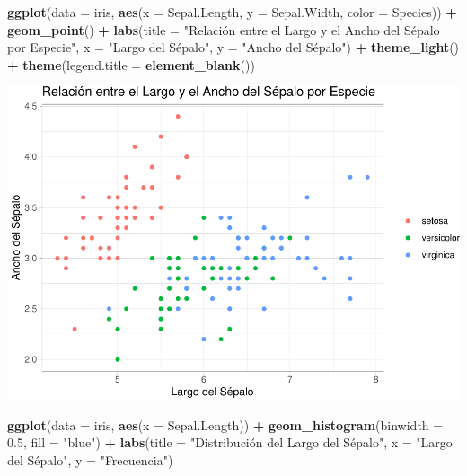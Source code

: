 \documentclass[
]{book}
\newenvironment{Shaded}{\begin{snugshade}}{\end{snugshade}}
\newcommand{\AttributeTok}[1]{\textcolor[rgb]{0.13,0.29,0.53}{#1}}
\newcommand{\FloatTok}[1]{\textcolor[rgb]{0.00,0.00,0.81}{#1}}
\newcommand{\FunctionTok}[1]{\textcolor[rgb]{0.13,0.29,0.53}{\textbf{#1}}}
\newcommand{\NormalTok}[1]{#1}
\newcommand{\SpecialCharTok}[1]{\textcolor[rgb]{0.81,0.36,0.00}{\textbf{#1}}}
\newcommand{\StringTok}[1]{\textcolor[rgb]{0.31,0.60,0.02}{#1}}
\begin{document}
\begin{Shaded}
\begin{Highlighting}[]
\FunctionTok{ggplot}\NormalTok{(}\AttributeTok{data =}\NormalTok{ iris, }\FunctionTok{aes}\NormalTok{(}\AttributeTok{x =}\NormalTok{ Sepal.Length, }\AttributeTok{y =}\NormalTok{ Sepal.Width, }\AttributeTok{color =}\NormalTok{ Species)) }\SpecialCharTok{+} 
  \FunctionTok{geom\_point}\NormalTok{() }\SpecialCharTok{+}
  \FunctionTok{labs}\NormalTok{(}\AttributeTok{title =} \StringTok{"Relación entre el Largo y el Ancho del Sépalo por Especie"}\NormalTok{,}
       \AttributeTok{x =} \StringTok{"Largo del Sépalo"}\NormalTok{,}
       \AttributeTok{y =} \StringTok{"Ancho del Sépalo"}\NormalTok{) }\SpecialCharTok{+}
  \FunctionTok{theme\_light}\NormalTok{() }\SpecialCharTok{+}
  \FunctionTok{theme}\NormalTok{(}\AttributeTok{legend.title =} \FunctionTok{element\_blank}\NormalTok{())}
\end{Highlighting}
\end{Shaded}

\includegraphics{bookdown-demo_files/figure-latex/unnamed-chunk-173-1.pdf}

\begin{Shaded}
\begin{Highlighting}[]
\FunctionTok{ggplot}\NormalTok{(}\AttributeTok{data =}\NormalTok{ iris, }\FunctionTok{aes}\NormalTok{(}\AttributeTok{x =}\NormalTok{ Sepal.Length)) }\SpecialCharTok{+} 
  \FunctionTok{geom\_histogram}\NormalTok{(}\AttributeTok{binwidth =} \FloatTok{0.5}\NormalTok{, }\AttributeTok{fill =} \StringTok{"blue"}\NormalTok{) }\SpecialCharTok{+}
  \FunctionTok{labs}\NormalTok{(}\AttributeTok{title =} \StringTok{"Distribución del Largo del Sépalo"}\NormalTok{,}
       \AttributeTok{x =} \StringTok{"Largo del Sépalo"}\NormalTok{,}
       \AttributeTok{y =} \StringTok{"Frecuencia"}\NormalTok{)}
\end{Highlighting}
\end{Shaded}
\end{document}
